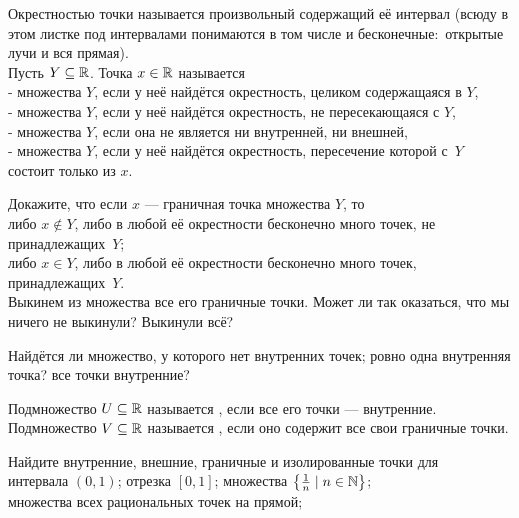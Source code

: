 \documentclass[a4paper,12pt]{article}
\begin{document}


 Окрестностью точки называется произвольный
содержащий её интервал {\small (всюду в этом листке под интервалами
понимаются в том числе и бесконечные:~открытые лучи и вся прямая)}.
\\
Пусть $Y\subseteq \mathbb{R}$.
Точка $x\in\mathbb{R}$ называется
\\-  множества $Y$, если у неё найдётся окрестность, целиком содержащаяся в $Y$,
\\-  множества $Y$, если у неё найдётся окрестность, не пересекающаяся с $Y$,
\\-  множества $Y$, если она не является ни внутренней, ни внешней,
\\-  множества $Y$, если у неё найдётся окрестность, пересечение которой с~$Y$ состоит только из $x$.


Докажите, что если $x$ — граничная точка множества $Y$, то
\\
либо $x\notin Y$, либо в любой её окрестности бесконечно много точек, не принадлежащих~$Y$;
\\
либо $x\in Y$, либо в любой её окрестности бесконечно много точек, принадлежащих~$Y$.
\\
Выкинем из множества все его граничные точки.
Может ли так оказаться, что мы ничего не выкинули? Выкинули всё?


Найдётся ли множество, у которого
нет внутренних точек;
ровно одна внутренняя точка?
все точки внутренние?






Подмножество $U\subseteq \mathbb{R}$ называется , если все его точки --- внутренние.\\
Подмножество $V\subseteq \mathbb{R}$ называется , если оно содержит все свои граничные точки.

Найдите внутренние, внешние, граничные и изолированные точки для\\
интервала $(0, 1)$;
отрезка $[0, 1]$;
множества $\left\{\frac{1}{n}\mid n\in\mathbb{N}\right\}$;\\
множества всех рациональных точек на прямой;
\end{document}
